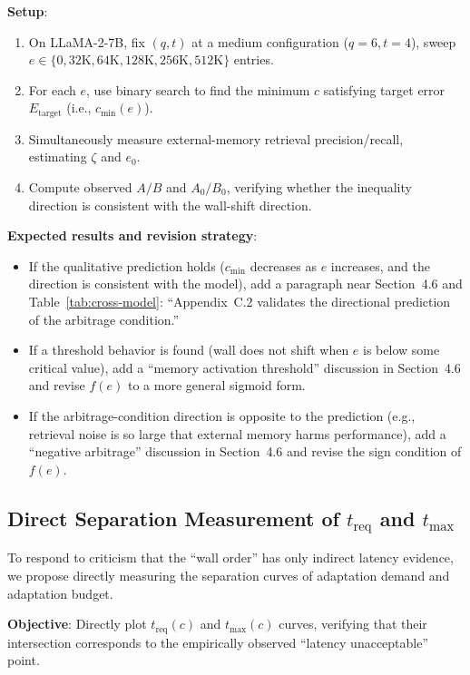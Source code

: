 \documentclass[11pt,a4paper]{article}
\theoremstyle{plain}
\theoremstyle{definition}
\begin{document}
\textbf{Setup}:
\begin{enumerate}
    \item On LLaMA-2-7B, fix $(q,t)$ at a medium configuration ($q=6, t=4$), sweep $e \in \{0, 32\text{K}, 64\text{K}, 128\text{K}, 256\text{K}, 512\text{K}\}$ entries.
    \item For each $e$, use binary search to find the minimum $c$ satisfying target error $E_{\text{target}}$ (i.e., $c_{\min}(e)$).
    \item Simultaneously measure external-memory retrieval precision/recall, estimating $\zeta$ and $e_0$.
    \item Compute observed $A/B$ and $A_0/B_0$, verifying whether the inequality direction is consistent with the wall-shift direction.
\end{enumerate}

\textbf{Expected results and revision strategy}:
\begin{itemize}
    \item If the qualitative prediction holds ($c_{\min}$ decreases as $e$ increases, and the direction is consistent with the model), add a paragraph near Section~4.6 and Table~\ref{tab:cross-model}: ``Appendix~C.2 validates the directional prediction of the arbitrage condition.''
    \item If a threshold behavior is found (wall does not shift when $e$ is below some critical value), add a ``memory activation threshold'' discussion in Section~4.6 and revise $f(e)$ to a more general sigmoid form.
    \item If the arbitrage-condition direction is opposite to the prediction (e.g., retrieval noise is so large that external memory harms performance), add a ``negative arbitrage'' discussion in Section~4.6 and revise the sign condition of $f(e)$.
\end{itemize}

\subsection{Direct Separation Measurement of $t_{\text{req}}$ and $t_{\max}$}\label{app:separation}

To respond to criticism that the ``wall order'' has only indirect latency evidence, we propose directly measuring the separation curves of adaptation demand and adaptation budget.

\textbf{Objective}: Directly plot $t_{\text{req}}(c)$ and $t_{\max}(c)$ curves, verifying that their intersection corresponds to the empirically observed ``latency unacceptable'' point.
\end{document}
